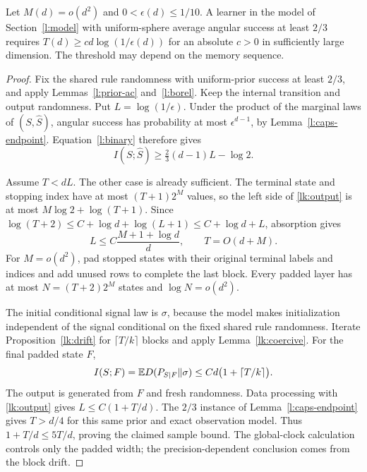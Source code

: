 \begin{corollary}\label{lk:regression}
Let \(M(d)=o(d^2)\) and
\(0<\epsilon(d)\le1/10\). A learner in the model of
Section~\ref{l:model} with uniform-sphere average angular success at
least \(2/3\) requires
\(T(d)\ge c d\log(1/\epsilon(d))\) for an absolute \(c>0\)
in sufficiently large dimension. The threshold may depend on the
memory sequence.
\end{corollary}
\begin{proof}
Fix the shared rule randomness with uniform-prior success at least
\(2/3\), and apply Lemmas~\ref{l:prior-ac} and~\ref{l:borel}.
Keep the internal transition and output randomness. Put
\(L=\log(1/\epsilon)\). Under the product of the marginal laws of
\((S,\widehat S)\), angular success has probability at most
\(\epsilon^{d-1}\), by Lemma~\ref{l:caps-endpoint}.
Equation~\eqref{l:binary} therefore gives
\begin{equation}\label{lk:output}
 I(S;\widehat S)\ge\tfrac23(d-1)L-\log2.
\end{equation}

Assume \(T<dL\). The other case is already sufficient. The terminal
state and stopping index have at most \((T+1)2^M\) values, so the
left side of \eqref{lk:output} is at most
\(M\log2+\log(T+1)\). Since
\(\log(T+2)\le C+\log d+\log(L+1)\le C+\log d+L\),
absorption gives
\[
 L\le C\frac{M+1+\log d}{d},\qquad T=O(d+M).
\]
For \(M=o(d^2)\), pad stopped states with their original terminal
labels and indices and add unused rows to complete the last block.
Every padded layer has at most \(N=(T+2)2^M\) states and
\(\log N=o(d^2)\).

The initial conditional signal law is \(\sigma\), because the model
makes initialization independent of the signal conditional on the
fixed shared rule randomness. Iterate
Proposition~\ref{lk:drift} for \(\lceil T/k\rceil\) blocks and apply
Lemma~\ref{lk:coercive}. For the final padded state \(F\),
\[
 I(S;F)=\mathbb E D(P_{S\mid F}\|\sigma)
 \le Cd\bigl(1+\lceil T/k\rceil\bigr).
\]
The output is generated from \(F\) and fresh randomness. Data
processing with \eqref{lk:output} gives
\(L\le C(1+T/d)\). The \(2/3\) instance of
Lemma~\ref{l:caps-endpoint} gives \(T>d/4\) for this same prior
and exact observation model. Thus \(1+T/d\le5T/d\), proving the
claimed sample bound. The global-clock calculation controls only
the padded width; the precision-dependent conclusion comes from
the block drift.
\end{proof}
